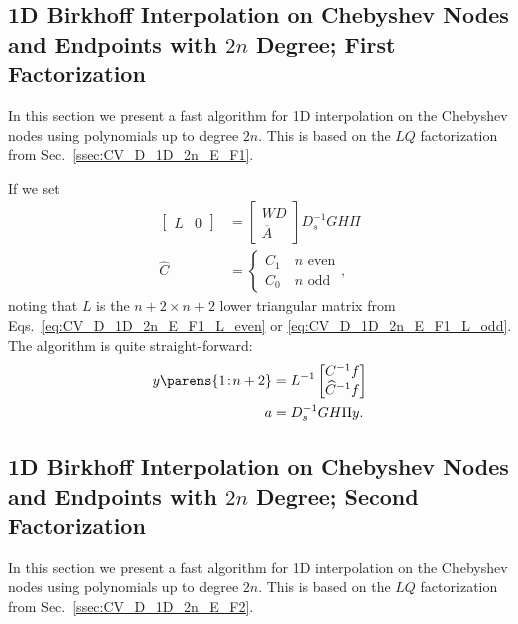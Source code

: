 \subsection{1D Birkhoff Interpolation on Chebyshev Nodes
and Endpoints with $2n$ Degree; First Factorization}
\label{ssec:fa_B_1D_2n_E_1}

In this section we present a fast algorithm for 1D interpolation
on the Chebyshev nodes using polynomials up to degree $2n$.
This is based on the $LQ$ factorization from Sec.~\ref{ssec:CV_D_1D_2n_E_F1}.

If we set
%
\begin{align}
    \begin{bmatrix} L & 0 \end{bmatrix}
        &= \begin{bmatrix} WD \\ \overline{A} \end{bmatrix} D_{s}^{-1}GH\Pi
        \nonumber\\
    \widehat{C} &= \begin{cases} C_{1} \quad n\text{ even} \\
        C_{0}\quad n\text{ odd} \end{cases},
\end{align}
%
noting that $L$ is the $n+2\times n+2$ lower triangular matrix
from Eqs.~\eqref{eq:CV_D_1D_2n_E_F1_L_even} or
\eqref{eq:CV_D_1D_2n_E_F1_L_odd}.
The algorithm is quite straight-forward:
%
\begin{align}
    y\parens{1\!:\!n+2} &= L^{-1}\begin{bmatrix} C^{-1}f \\ \widehat{C}^{-1}f
        \end{bmatrix} \nonumber\\
    a &= D_{s}^{-1}GH\Pi y.
\end{align}
%



\subsection{1D Birkhoff Interpolation on Chebyshev Nodes
and Endpoints with $2n$ Degree; Second Factorization}
\label{ssec:fa_B_1D_2n_E_2}

In this section we present a fast algorithm for 1D interpolation
on the Chebyshev nodes using polynomials up to degree $2n$.
This is based on the $LQ$ factorization from Sec.~\ref{ssec:CV_D_1D_2n_E_F2}.

